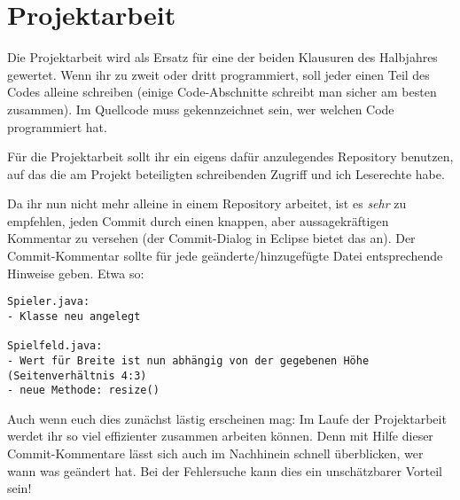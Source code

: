 \chapter{Projektarbeit}
\renewcommand{\chaptertitle}{Projektarbeit}

\lehead[]{\normalfont\sffamily\hspace*{-2.00cm}\textcolor{white}{\colorbox{lightblue}{\makebox[1.60cm][r]{\thechapter}}}\hspace{0.17cm}\textcolor{lightblue}{\chaptertitle}}
\rohead[]{\textcolor{lightblue}{\chaptertitle}\normalfont\sffamily\hspace*{0.17cm}\textcolor{white}{\colorbox{lightblue}{\makebox[1.60cm][l]{\thechapter}}}\hspace{-2.00cm}}
\rehead[]{\textcolor{lightblue}{AvHG, Inf, My}}
\lohead[]{\textcolor{lightblue}{AvHG, Inf, My}}

\lstset{style=myJava}

Die Projektarbeit wird als Ersatz für eine der beiden Klausuren des Halbjahres
gewertet. Wenn ihr zu zweit oder dritt programmiert, soll jeder einen Teil des
Codes alleine schreiben (einige Code-Abschnitte schreibt man sicher am besten
zusammen). Im Quellcode muss gekennzeichnet sein, wer welchen Code programmiert
hat.

Für die Projektarbeit sollt ihr ein eigens dafür anzulegendes Repository
benutzen, auf das die am Projekt beteiligten schreibenden Zugriff und ich
Leserechte habe.

Da ihr nun nicht mehr alleine in einem Repository arbeitet, ist es \emph{sehr}
zu empfehlen, jeden Commit durch einen knappen, aber aussagekräftigen Kommentar
zu versehen (der Commit-Dialog in Eclipse bietet das an). Der Commit-Kommentar
sollte für jede geänderte/hinzugefügte Datei entsprechende Hinweise geben. Etwa
so:

\begin{lstlisting}
Spieler.java:
- Klasse neu angelegt

Spielfeld.java: 
- Wert für Breite ist nun abhängig von der gegebenen Höhe (Seitenverhältnis 4:3)
- neue Methode: resize()
\end{lstlisting}

Auch wenn euch dies zunächst lästig erscheinen mag: Im Laufe der Projektarbeit
werdet ihr so viel effizienter zusammen arbeiten können. Denn mit Hilfe dieser
Commit-Kommentare lässt sich auch im Nachhinein schnell überblicken, wer wann
was geändert hat. Bei der Fehlersuche kann dies ein unschätzbarer Vorteil sein!

